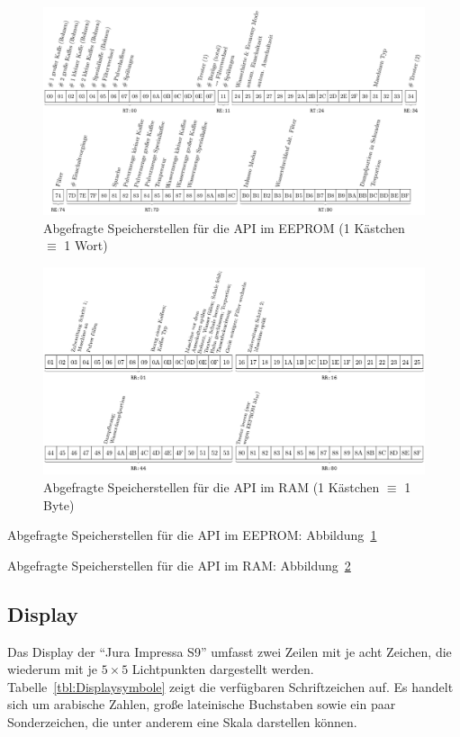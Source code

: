 \begin{figure}
  \begin{center}
    \includegraphics[scale=0.94]{images/chapter_5/API-EEPROM}
    \caption{Abgefragte Speicherstellen für die \ac{API} im \ac{EEPROM} (1 Kästchen $\equiv$ 1 Wort)}
    \label{fig:API-EEPROM}
  \end{center}
\end{figure}
\begin{figure}
  \begin{center}
    \includegraphics[scale=1]{images/chapter_5/API-RAM}
    \caption{Abgefragte Speicherstellen für die \ac{API} im \ac{RAM} (1 Kästchen $\equiv$ 1 Byte)}
    \label{fig:API-RAM}
  \end{center}
\end{figure}

\todo
Abgefragte Speicherstellen für die \ac{API} im \ac{EEPROM}: Abbildung~\ref{fig:API-EEPROM}

Abgefragte Speicherstellen für die \ac{API} im \ac{RAM}: Abbildung~\ref{fig:API-RAM}
\todo

\subsection{Display}\label{sec:Display}
Das Display der "`Jura Impressa S9"' umfasst zwei Zeilen mit je acht Zeichen, die wiederum mit je $5 \times 5$ Lichtpunkten dargestellt werden.
Tabelle~\ref{tbl:Displaysymbole} zeigt die verfügbaren Schriftzeichen auf.
Es handelt sich um arabische Zahlen, große lateinische Buchstaben sowie ein paar Sonderzeichen, die unter anderem eine Skala darstellen können.

